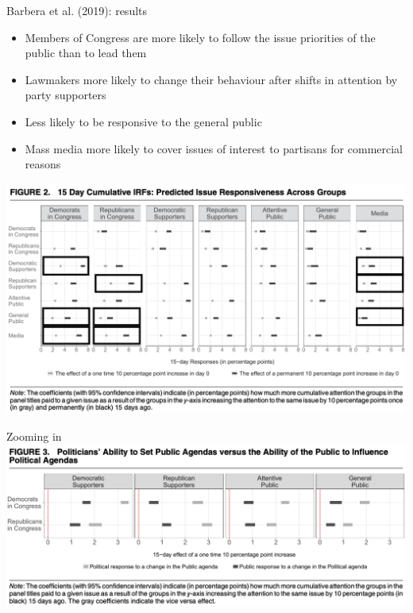 \documentclass[english]{beamer}
\begin{document}
\begin{frame}{Barbera et al. (2019): results}
    \begin{itemize}\setlength{\itemsep}{1.2em}
        \item Members of Congress are more likely to follow the issue priorities of the public than to lead them
        \item Lawmakers more likely to change their behaviour after shifts in attention by party supporters
        \item Less likely to be responsive to the general public
        \item Mass media more likely to cover issues of interest to partisans for commercial reasons
    \end{itemize}
\end{frame}

\begin{frame}{}
    \centering
    \includegraphics[width=1 \textwidth]{Images/barbera_mainres.png}
\end{frame}

\begin{frame}{Zooming in}
    \centering
    \includegraphics[width=1 \textwidth]{Images/barbera_mainres2.png}
\end{frame}
\end{document}
